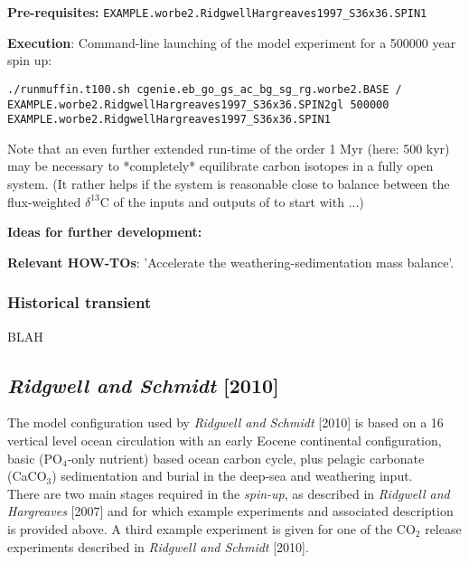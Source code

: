 \documentclass[10pt,twoside]{article}
\begin{document}
\noindent \textbf{Pre-requisites:} \texttt{EXAMPLE.worbe2.RidgwellHargreaves1997\_S36x36.SPIN1}

\noindent \textbf{Execution}: Command-line launching of the model experiment for a 500000 year spin up:
\vspace{-10pt}\small\begin{verbatim}
./runmuffin.t100.sh cgenie.eb_go_gs_ac_bg_sg_rg.worbe2.BASE / 
EXAMPLE.worbe2.RidgwellHargreaves1997_S36x36.SPIN2gl 500000 
EXAMPLE.worbe2.RidgwellHargreaves1997_S36x36.SPIN1
\end{verbatim}\normalsize\vspace{-10pt}
Note that an even further extended run-time of the order 1 Myr (here: 500 kyr) may be necessary to *completely* equilibrate carbon isotopes in a fully open system. (It rather helps if the system is reasonable close to balance between the flux-weighted $\delta^{13}$C of the inputs and outputs of to start with ...)

\noindent \textbf{Ideas for further development:} 

\noindent \textbf{Relevant HOW-TOs}: 'Accelerate the weathering-sedimentation mass balance'.


\subsubsection{Historical transient}\label{EXAMPLE.worbe2.RidgwellHargreaves1997_S36x36.HISTORICAL}

BLAH


\subsection{\textit{Ridgwell and Schmidt} [2010]}

The model configuration used by \textit{Ridgwell and Schmidt} [2010] is based on a 16 vertical level ocean circulation with an early Eocene continental configuration, basic (PO$_{4}$-only nutrient) based ocean carbon cycle, plus pelagic carbonate (CaCO$_{3}$) sedimentation and burial in the  deep-sea and weathering input.
\\ There are two main stages required in the \textit{spin-up}, as described in \textit{Ridgwell and Hargreaves} [2007] and for which example experiments and associated description is provided above. A third example experiment is given for one of the CO$_{2}$ release experiments described in \textit{Ridgwell and Schmidt} [2010].
\end{document}

